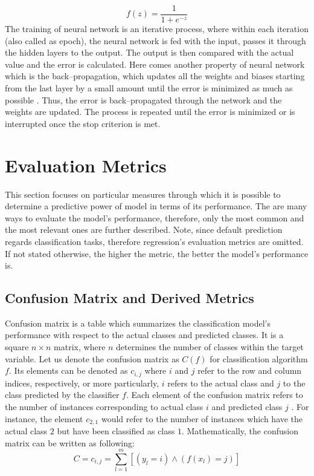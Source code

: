 \begin{equation}
    f(z) = \frac{1}{1+e^{-z}}
\end{equation}
The training of neural network is an iterative process, where within each iteration (also called as epoch), the neural network is fed with the input, passes it through the hidden layers to the output. The output is then compared with the actual value and the error is calculated.
Here comes another property of neural network which is the back--propagation, which updates all the weights and biases starting from the last layer by a small amount until the error is minimized as much as possible \citep{ayyadevara2018pro}. Thus, the error is back--propagated through the network and the weights are updated. The process is repeated until the error is minimized or is interrupted once the stop criterion is met.

\section{Evaluation Metrics}
\label{sec:evaltheory}

This section focuses on particular measures through which it is possible to determine a predictive power of model in terms of its performance.
The are many ways to evaluate the model's performance, therefore, only the most common and the most relevant ones are further described.
Note, since default prediction regards classification tasks, therefore regression's evaluation metrics are omitted.
If not stated otherwise, the higher the metric, the better the model's performance is.
\subsection{Confusion Matrix and Derived Metrics}


Confusion matrix is a table which summarizes the classification model's performance with respect to the actual classes and predicted classes.
It is a square $n \times n$ matrix, where $n$ determines the number of classes within the target variable.
Let us denote the confusion matrix as $C\left(f\right)$ for classification algorithm $f$. 
Its elements can be denoted as $c_{i,j}$ where $i$ and $j$ refer to the row and column indices, respectively, or more particularly, $i$ refers to the actual class and $j$ to the class predicted by the classifier $f$.
Each element of the confusion matrix refers to the number of instances corresponding to actual class $i$ and predicted class $j$ \citep{japkowicz2011evaluating}. For instance, the element $c_{2,1}$ would refer to the number of instances which have the actual class $2$ but have been classified as class $1$.
Mathematically, the confusion matrix can be written as following:
\begin{equation}\label{eq}
C = {c_{i,j} = \sum_{l=1}^{m}[(y_l=i) \land (f(x_l)=j)]}
\end{equation}

